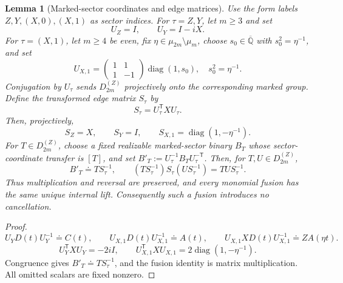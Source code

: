 \documentclass[11pt,letterpaper,onecolumn]{article}
\theoremstyle{plain}
\newtheorem{lemma}[lemma]{Lemma}
\theoremstyle{definition}
\theoremstyle{remark}
\newcommand{\AlgNums}{\overline{\mathbb Q}}
\newcommand{\DihZ}[1]{{D_{#1}^{(Z)}}}
\newcommand{\diag}{\operatorname{diag}}
\begin{document}
\begin{lemma}[Marked-sector coordinates and edge matrices]
\label{lem:marked-sector-dictionary}\leavevmode\newline
Use the form labels \(Z,Y,(X,0),(X,1)\) as sector indices.
For \(\tau=Z,Y\), let \(m\ge3\) and set
\begin{equation*}
 U_{Z}=I,\qquad
 U_{Y}=I-iX.
\end{equation*}
For \(\tau=(X,1)\), let \(m\ge4\) be even, fix
\(\eta\in\mu_{2m}\setminus\mu_m\), choose \(s_0\in\AlgNums\) with
\(s_0^2=\eta^{-1}\), and set
\begin{equation*}
 U_{X,1}=
 \begin{pmatrix}1&1\\1&-1\end{pmatrix}\diag(1,s_0),
 \quad s_0^2=\eta^{-1}.
\end{equation*}
Conjugation by \(U_\tau\) sends \(\DihZ{2m}\) projectively onto the
corresponding marked group.  Define the transformed edge matrix \(S_\tau\) by
\[
 S_\tau=U_\tau^{\mathsf T}XU_\tau.
\]
Then, projectively,
\begin{equation*}
 S_{Z}=X,\qquad
 S_{Y}=I,\qquad
 S_{X,1}=\diag(1,-\eta^{-1}).
\end{equation*}
For \(T\in\DihZ{2m}\), choose a fixed realizable marked-sector binary
\(B_T\) whose sector-coordinate transfer is \([T]\), and set
\(B'_T:=U_\tau^{-1}B_TU_\tau^{-\mathsf T}\).  Then, for
\(T,U\in\DihZ{2m}\),
\begin{equation}
 B'_T\doteq T S_\tau^{-1},
 \qquad
 (TS_\tau^{-1})S_\tau(US_\tau^{-1})
 =TU S_\tau^{-1}.
 \label{eq:marked-sector-fusion}
\end{equation}
Thus multiplication and reversal are preserved, and every monomial fusion
has the same unique internal lift. Consequently such a fusion introduces no
cancellation.
\end{lemma}

\begin{proof}
\[
 U_{Y}D(t)U_{Y}^{-1}\doteq C(t),\qquad
 U_{X,1}D(t)U_{X,1}^{-1}\doteq A(t),
 \qquad
 U_{X,1}XD(t)U_{X,1}^{-1}
 \doteq ZA(\eta t).
\]
\[
 U_{Y}^{\mathsf T}XU_{Y}=-2iI,
 \qquad
 U_{X,1}^{\mathsf T}XU_{X,1}
 =2\diag(1,-\eta^{-1}).
\]
Congruence gives \(B'_T\doteq TS_\tau^{-1}\), and the fusion
identity is matrix multiplication. All omitted scalars are fixed nonzero.
\end{proof}
\end{document}
